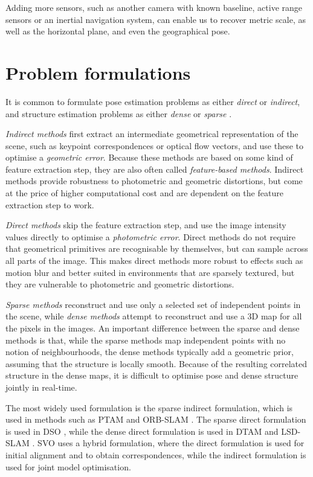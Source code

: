 Adding more sensors, such as another camera with known baseline, active range sensors or an inertial navigation system, can enable us to recover metric scale, as well as the horizontal plane, and even the geographical pose.

\section{Problem formulations}
It is common to formulate pose estimation problems as either \emph{direct} or \emph{indirect}, and structure estimation problems as either \emph{dense} or \emph{sparse} \cite{Engel2018}.

\emph{Indirect methods} first extract an intermediate geometrical representation of the scene, such as keypoint correspondences or optical flow vectors, and use these to optimise a \emph{geometric error}.
Because these methods are based on some kind of feature extraction step, they are also often called \emph{feature-based methods}.
Indirect methods provide robustness to photometric and geometric distortions, but come at the price of higher computational cost and are dependent on the feature extraction step to work.

\emph{Direct methods} skip the feature extraction step, and use the image intensity values directly to optimise a \emph{photometric error}.
Direct methods do not require that geometrical primitives are recognisable by themselves, but can sample across all parts of the image.
This makes direct methods more robust to effects such as motion blur and better suited in environments that are sparsely textured, but they are vulnerable to photometric and geometric distortions.

\emph{Sparse methods} reconstruct and use only a selected set of independent points in the scene, while \emph{dense methods} attempt to reconstruct and use a 3D map for all the pixels in the images.
An important difference between the sparse and dense methods is that, while the sparse methods map independent points with no notion of neighbourhoods, the dense methods typically add a geometric prior, assuming that the structure is locally smooth.
Because of the resulting correlated structure in the dense maps, it is difficult to optimise pose and dense structure jointly in real-time.

The most widely used formulation is the sparse indirect formulation, which is used in methods such as PTAM \cite{Klein2007ParallelWorkspaces} and ORB-SLAM \cite{Mur-Artal2015ORB-SLAM:System}.
The sparse direct formulation is used in DSO \cite{Engel2018}, while the dense direct formulation is used in DTAM \cite{Newcombe2011DTAM:Real-time} and LSD-SLAM \cite{Engel2014LSD-SLAM:SLAM}.
SVO \cite{Forster2014SVO:Odometry} uses a hybrid formulation, where the direct formulation is used for initial alignment and to obtain correspondences, while the indirect formulation is used for joint model optimisation.

